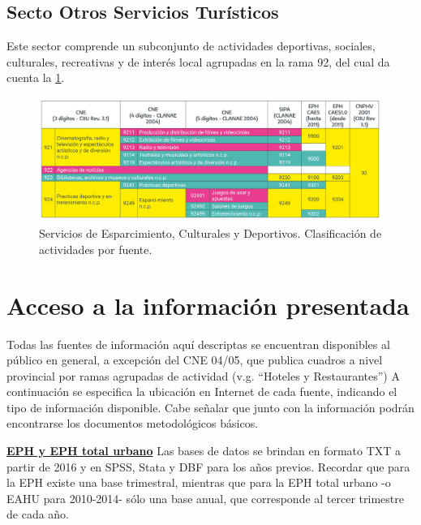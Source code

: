 \documentclass[
  openany]{book}
\begin{document}
\hypertarget{secto-otros-servicios-turuxedsticos}{%
\subsection{Secto Otros Servicios Turísticos}\label{secto-otros-servicios-turuxedsticos}}

Este sector comprende un subconjunto de actividades deportivas, sociales, culturales, recreativas y de interés local agrupadas en la rama 92, del cual da cuenta la \ref{fig:empleofuentes11}.

\begin{figure}

{\centering \includegraphics[width=1\linewidth]{imagenes/figura3.11} 

}

\caption{ Servicios de Esparcimiento, Culturales y  Deportivos. Clasificación de actividades por fuente.}\label{fig:empleofuentes11}
\end{figure}

\hypertarget{acceso-a-la-informaciuxf3n-presentada}{%
\section{Acceso a la información presentada}\label{acceso-a-la-informaciuxf3n-presentada}}

Todas las fuentes de información aquí descriptas se encuentran disponibles al público en general, a excepción del CNE 04/05, que publica cuadros a nivel provincial por ramas agrupadas de actividad (v.g. ``Hoteles y Restaurantes'')
A continuación se especifica la ubicación en Internet de cada fuente, indicando el tipo de información disponible.
Cabe señalar que junto con la información podrán encontrarse los documentos metodológicos básicos.

\href{https://www.indec.gob.ar/indec/web/Institucional-Indec-BasesDeDatos-1}{\textbf{EPH y EPH total urbano}} Las bases de datos se brindan en formato TXT a partir de 2016 y en SPSS, Stata y DBF para los años previos.
Recordar que para la EPH existe una base trimestral, mientras que para la EPH total urbano -o EAHU para 2010-2014- sólo una base anual, que corresponde al tercer trimestre de cada año.
\end{document}
